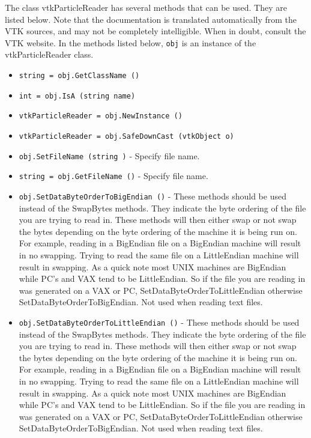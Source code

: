 The class vtkParticleReader has several methods that can be used.
  They are listed below.
Note that the documentation is translated automatically from the VTK sources,
and may not be completely intelligible.  When in doubt, consult the VTK website.
In the methods listed below, \verb|obj| is an instance of the vtkParticleReader class.
\begin{itemize}
\item  \verb|string = obj.GetClassName ()|

\item  \verb|int = obj.IsA (string name)|

\item  \verb|vtkParticleReader = obj.NewInstance ()|

\item  \verb|vtkParticleReader = obj.SafeDownCast (vtkObject o)|

\item  \verb|obj.SetFileName (string )| -  Specify file name.

\item  \verb|string = obj.GetFileName ()| -  Specify file name.

\item  \verb|obj.SetDataByteOrderToBigEndian ()| -  These methods should be used instead of the SwapBytes methods.
 They indicate the byte ordering of the file you are trying
 to read in. These methods will then either swap or not swap
 the bytes depending on the byte ordering of the machine it is
 being run on. For example, reading in a BigEndian file on a
 BigEndian machine will result in no swapping. Trying to read
 the same file on a LittleEndian machine will result in swapping.
 As a quick note most UNIX machines are BigEndian while PC's
 and VAX tend to be LittleEndian. So if the file you are reading
 in was generated on a VAX or PC, SetDataByteOrderToLittleEndian 
 otherwise SetDataByteOrderToBigEndian. Not used when reading
 text files. 

\item  \verb|obj.SetDataByteOrderToLittleEndian ()| -  These methods should be used instead of the SwapBytes methods.
 They indicate the byte ordering of the file you are trying
 to read in. These methods will then either swap or not swap
 the bytes depending on the byte ordering of the machine it is
 being run on. For example, reading in a BigEndian file on a
 BigEndian machine will result in no swapping. Trying to read
 the same file on a LittleEndian machine will result in swapping.
 As a quick note most UNIX machines are BigEndian while PC's
 and VAX tend to be LittleEndian. So if the file you are reading
 in was generated on a VAX or PC, SetDataByteOrderToLittleEndian 
 otherwise SetDataByteOrderToBigEndian. Not used when reading
 text files. 


\end{itemize}

